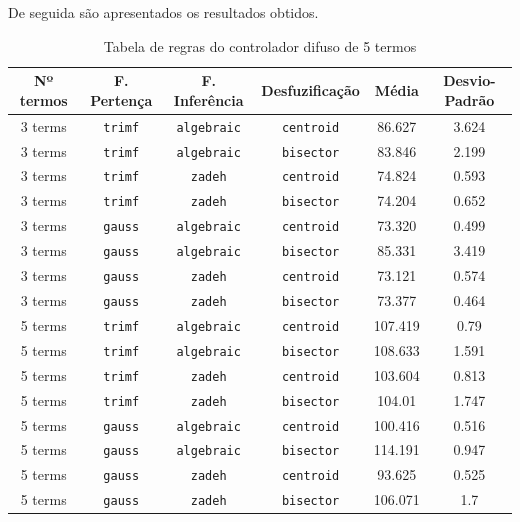 \documentclass{article}
\begin{document}
De seguida são apresentados os resultados obtidos.
\begin{table}[!h]
\centering
	\caption{Tabela de regras do controlador difuso de 5 termos}
	\label{results}
	\begin{tabular}{|c|c|c|c|c|c|}
		\hline 
		\textbf{Nº termos} & \textbf{F. Pertença} & \textbf{F. Inferência} & \textbf{Desfuzificação} & \textbf{Média} & \textbf{Desvio-Padrão} \\
		\hline
		3 terms & \texttt{trimf} & \texttt{algebraic} & \texttt{centroid} & 86.627 & 3.624 \\
		\hline
		3 terms & \texttt{trimf} & \texttt{algebraic} & \texttt{bisector} & 83.846 & 2.199 \\
		\hline
		3 terms & \texttt{trimf} & \texttt{zadeh} & \texttt{centroid} & 74.824 & 0.593 \\
		\hline
		3 terms & \texttt{trimf} & \texttt{zadeh} & \texttt{bisector} & 74.204 & 0.652 \\
		\hline
		3 terms & \texttt{gauss} & \texttt{algebraic} & \texttt{centroid} & 73.320 & 0.499 \\
		\hline
		3 terms & \texttt{gauss} & \texttt{algebraic} & \texttt{bisector} & 85.331 & 3.419 \\
		\hline
		3 terms & \texttt{gauss} & \texttt{zadeh} & \texttt{centroid} & 73.121 & 0.574 \\
		\hline
		3 terms & \texttt{gauss} & \texttt{zadeh} & \texttt{bisector} & 73.377 & 0.464 \\
		\hline
		5 terms & \texttt{trimf} & \texttt{algebraic} & \texttt{centroid} & 107.419 & 0.79 \\
		\hline
		5 terms & \texttt{trimf} & \texttt{algebraic} & \texttt{bisector} & 108.633 & 1.591 \\
		\hline
		5 terms & \texttt{trimf} & \texttt{zadeh} & \texttt{centroid} & 103.604 & 0.813 \\
		\hline
		5 terms & \texttt{trimf} & \texttt{zadeh} & \texttt{bisector} & 104.01 & 1.747 \\
		\hline
		5 terms & \texttt{gauss} & \texttt{algebraic} & \texttt{centroid} & 100.416 & 0.516 \\
		\hline
		5 terms & \texttt{gauss} & \texttt{algebraic} & \texttt{bisector} & 114.191 & 0.947 \\
		\hline
		5 terms & \texttt{gauss} & \texttt{zadeh} & \texttt{centroid} & 93.625 & 0.525 \\
		\hline
		5 terms & \texttt{gauss} & \texttt{zadeh} & \texttt{bisector} & 106.071 & 1.7 \\
		\hline
	\end{tabular} 
\end{table}
\end{document}
